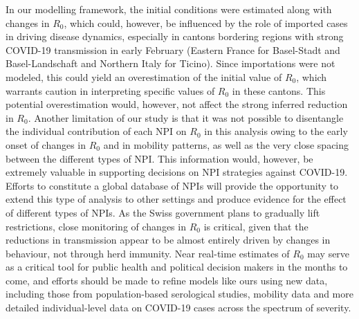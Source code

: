   In our modelling framework, the initial conditions were estimated along with changes in $R_0$, which could, however, be influenced by the role of imported cases in driving disease dynamics, especially in cantons bordering regions with strong COVID-19 transmission in early February (Eastern France for Basel-Stadt and Basel-Landschaft and Northern Italy for Ticino). 
  Since importations were not modeled, this could yield an overestimation of the initial value of $R_0$, which warrants caution in interpreting specific values of $R_0$ in these cantons. This potential overestimation would, however, not affect the strong inferred reduction in $R_0$. Another limitation of our study is that it was not possible to disentangle the individual contribution of each NPI on $R_0$ in this analysis owing to the early onset of changes in $R_0$ and in mobility patterns, as well as the very close spacing between the different types of NPI. This information would, however, be extremely valuable in supporting decisions on NPI strategies against COVID-19. Efforts to constitute a global database of NPIs will provide the opportunity to extend this type of analysis to other settings and produce evidence for the effect of different types of NPIs\cite{HITCOVIDTeam:HealthInterventionsTracking:2020}. As the Swiss government plans to gradually lift restrictions, close monitoring of changes in $R_0$ is critical, given that the reductions in transmission appear to be almost entirely driven by changes in behaviour, not through herd immunity. Near real-time estimates of $R_0$ may serve as a critical tool for public health and political decision makers in the months to come, and efforts should be made to refine models like ours using new data, including those from population-based serological studies, mobility data and more detailed individual-level data on COVID-19 cases across the spectrum of severity.

